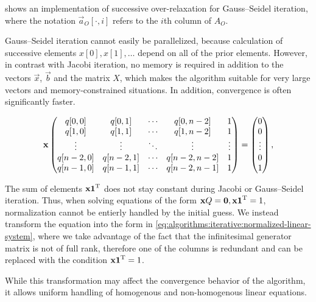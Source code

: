  shows an implementation of
successive over-relaxation for Gauss--Seidel iteration, where the
notation $\vec{a}_O[\cdot, i]$ refers to the $i$th column of $A_O$.

Gauss--Seidel iteration cannot easily be parallelized, because
calculation of successive elements $x[0], x[1], \ldots$ depend on all
of the prior elements. However, in contrast with Jacobi iteration, no
memory is required in addition to the vectors $\vec{x}$, $\vec{b}$ and
the matrix $X$, which makes the algorithm suitable for very large
vectors and memory-constrained situations. In addition, convergence is
often significantly faster.

\begin{figure}
\begin{equation}
  \label{eq:algorithms:iterative:normalized-linear-system}
  \vec{x} \begin{pmatrix}
    q[0,0] & q[0,1] & \cdots & q[0,n - 2] & 1 \\
    q[1,0] & q[1,1] & \cdots & q[1,n - 2] & 1 \\
    \vdots & \vdots & \ddots & \vdots & \vdots \\
    q[n - 2,0] & q[n - 2,1] & \cdots & q[n - 2,n - 2] & 1 \\
    q[n - 1,0] & q[n - 1,1] & \cdots & q[n - 2,n - 1] & 1 \\
  \end{pmatrix} = \begin{pmatrix}
    0 \\ 0 \\ \vdots \\ 0 \\ 1
  \end{pmatrix} \text,
\end{equation}
\end{figure}

The sum of elements $\bm{\mathrm{x}} \bm{\mathrm{1}}^{\mathrm{T}}$ does not stay constant during
Jacobi or Gauss--Seidel iteration. Thus, when solving equations of the
form $\bm{\mathrm{x}} Q = \bm{\mathrm{0}}, \bm{\mathrm{x}} \bm{\mathrm{1}}^{\mathrm{T}} = 1$, normalization
cannot be entierly handled by the initial guess. We instead transform
the equation into the form in
\cref{eq:algorithms:iterative:normalized-linear-system}, where we take
advantage of the fact that the infinitesimal generator matrix is not
of full rank, therefore one of the columns is redundant and can be
replaced with the condition $\bm{\mathrm{x}} \bm{\mathrm{1}}^{\mathrm{T}} = 1$.

While this transformation may affect the convergence behavior of the
algorithm, it allows uniform handling of homogenous and non-homogenous
linear equations.

